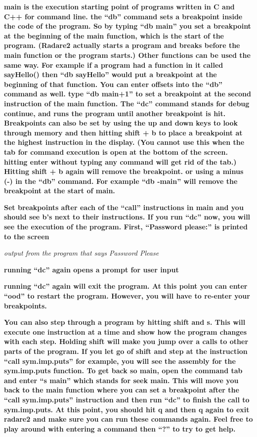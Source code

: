 \documentclass[letterpaper]{article}
\newcommand{\sitfig}[3]{
\begin{figure}[H]
\centering
\makebox[\textwidth][c]{
#2
}
\label{#1}
\end{figure}
}
\newcommand{\sitgfx}[4][scale=1.0]{
\sitfig{#3}{\texttt{[image: \#2]}}{#4}
}
\begin{document}
\textbf{main is the execution starting point of programs written in C and C++ for command line. the ``db'' command sets
a breakpoint inside the code of the program. So by typing ``db main'' you set a breakpoint at the beginning of the main
function, which is the start of the program. (Radare2 actually starts a program and breaks before the main function or
the program starts.) Other functions can be used the same way. For example if a program had a function in it called
sayHello() then ``db sayHello'' would put a breakpoint at the beginning of that function. You can enter offsets into
the ``db'' command as well. type ``db main+1'' to set a breakpoint at the second instruction of the main function. The
``dc'' command stands for debug continue, and runs the program until another breakpoint is hit. Breakpoints can also be
set by using the up and down keys to look through memory and then hitting shift + b to place a breakpoint at the
highest instruction in the display. (You cannot use this when the tab for command execution is open at the bottom of
the screen. hitting enter without typing any command will get rid of the tab.) Hitting shift + b again will remove the
breakpoint. or using a minus (-) in the ``db'' command. For example ``db -main'' will remove the breakpoint at the
start of main.}

  
\sitgfx[width=5.8335in,height=3.6457in]{reversing-img081.png}{fig:unk}{TODO CAPTION}
 

\textbf{Set breakpoints after each of the ``call'' instructions in main and you should see b's next to their
instructions. If you run ``dc'' now, you will see the execution of the program. First, ``Password please:'' is printed
to the screen}

  
\sitgfx[width=5.8335in,height=3.6457in]{reversing-img082.png}{fig:unk}{TODO CAPTION}
 

\textit{output from the program that says Password Please}

\textbf{running ``dc'' again opens a prompt for user input}

  
\sitgfx[width=5.8335in,height=3.6457in]{reversing-img085.png}{fig:unk}{TODO CAPTION}
 

\textbf{running ``dc'' again will exit the program. At this point you can enter ``ood'' to restart the program. However,
you will have to re-enter your breakpoints.}

\textbf{You can also step through a program by hitting shift and s. This will execute one instruction at a time and show
how the program changes with each step. Holding shift will make you jump over a calls to other parts of the program. If
you let go of shift and step at the instruction ``call sym.imp.puts'' for example, you will see the assembly for the
sym.imp.puts function. To get back so main, open the command tab and enter ``s main'' which stands for seek main. This
will move you back to the main function where you can set a breakpoint after the ``call sym.imp.puts'' instruction and
then run ``dc'' to finish the call to sym.imp.puts. At this point, you should hit q and then q again to exit radare2
and make sure you can run these commands again. Feel free to play around with entering a command then ``?'' to try to
get help.}
\end{document}
